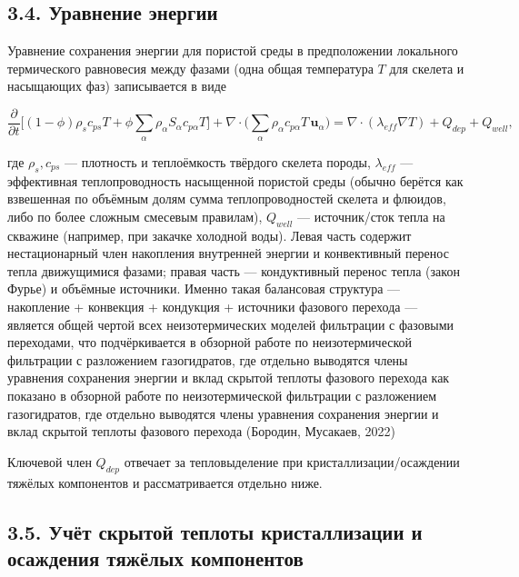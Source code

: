 \documentclass[11pt]{extarticle}
\begin{document}
\subsection{3.4. Уравнение энергии}\label{ux443ux440ux430ux432ux43dux435ux43dux438ux435-ux44dux43dux435ux440ux433ux438ux438}

Уравнение сохранения энергии для пористой среды в предположении локального термического равновесия между фазами (одна общая температура \(T\) для скелета и насыщающих фаз) записывается в виде

\[
\frac{\partial}{\partial t}\Big[(1-\phi)\rho_s c_{ps} T + \phi\sum_\alpha \rho_\alpha S_\alpha c_{p\alpha} T\Big] + \nabla\cdot\Big(\sum_\alpha \rho_\alpha c_{p\alpha} T\, \mathbf{u}_\alpha\Big) = \nabla\cdot(\lambda_{eff}\nabla T) + Q_{dep} + Q_{well} ,
\]

где \(\rho_s, c_{ps}\) --- плотность и теплоёмкость твёрдого скелета породы, \(\lambda_{eff}\) --- эффективная теплопроводность насыщенной пористой среды (обычно берётся как взвешенная по объёмным долям сумма теплопроводностей скелета и флюидов, либо по более сложным смесевым правилам), \(Q_{well}\) --- источник/сток тепла на скважине (например, при закачке холодной воды). Левая часть содержит нестационарный член накопления внутренней энергии и конвективный перенос тепла движущимися фазами; правая часть --- кондуктивный перенос тепла (закон Фурье) и объёмные источники. Именно такая балансовая структура --- накопление + конвекция + кондукция + источники фазового перехода --- является общей чертой всех неизотермических моделей фильтрации с фазовыми переходами, что подчёркивается в обзорной работе по неизотермической фильтрации с разложением газогидратов, где отдельно выводятся члены уравнения сохранения энергии и вклад скрытой теплоты фазового перехода как показано в обзорной работе по неизотермической фильтрации с разложением газогидратов, где отдельно выводятся члены уравнения сохранения энергии и вклад скрытой теплоты фазового перехода (Бородин, Мусакаев, 2022)

Ключевой член \(Q_{dep}\) отвечает за тепловыделение при кристаллизации/осаждении тяжёлых компонентов и рассматривается отдельно ниже.

\subsection{3.5. Учёт скрытой теплоты кристаллизации и осаждения тяжёлых компонентов}\label{ux443ux447ux451ux442-ux441ux43aux440ux44bux442ux43eux439-ux442ux435ux43fux43bux43eux442ux44b-ux43aux440ux438ux441ux442ux430ux43bux43bux438ux437ux430ux446ux438ux438-ux438-ux43eux441ux430ux436ux434ux435ux43dux438ux44f-ux442ux44fux436ux451ux43bux44bux445-ux43aux43eux43cux43fux43eux43dux435ux43dux442ux43eux432}
\end{document}
